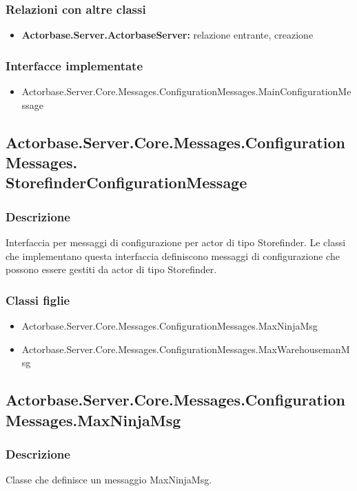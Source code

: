 \documentclass[a4paper]{article}
\begin{document}
			\subsubsection{Relazioni con altre classi}
			\begin{itemize}
				\item \textbf{Actorbase.Server.ActorbaseServer:} relazione entrante, creazione
			\end{itemize}
			\subsubsection{Interfacce implementate}
			\begin{itemize}
				\item Actorbase.Server.Core.Messages.ConfigurationMessages.MainConfigurationMessage
			\end{itemize}

			\subsection{Actorbase.Server.Core.Messages.ConfigurationMessages.\\ StorefinderConfigurationMessage}
			\subsubsection{Descrizione}
				Interfaccia per messaggi di configurazione per actor di tipo Storefinder. 
				Le classi che implementano questa interfaccia definiscono messaggi di configurazione che possono essere gestiti da actor di tipo Storefinder.
			\subsubsection{Classi figlie}
			\begin{itemize}
				\item Actorbase.Server.Core.Messages.ConfigurationMessages.MaxNinjaMsg
				\item Actorbase.Server.Core.Messages.ConfigurationMessages.MaxWarehousemanMsg
			\end{itemize}

			\subsection{Actorbase.Server.Core.Messages.ConfigurationMessages.MaxNinjaMsg}
			\subsubsection{Descrizione}
				Classe che definisce un messaggio MaxNinjaMsg.
\end{document}
